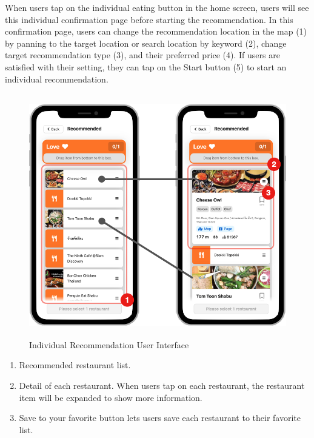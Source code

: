 \documentclass[12pt,oneside,openright,a4paper]{cpe-english-project}
\begin{document}
When users tap on the individual eating button in the home screen, users will see this individual confirmation page before starting the recommendation. In this confirmation page, users can change the recommendation location in the map (1) by panning to the target location or search location by keyword (2), change target recommendation type (3), and their preferred price (4). If users are satisfied with their setting, they can tap on the Start button (5) to start an individual recommendation.
\begin{figure}[H]\centering
\includegraphics[height=300pt]{./images/4ui_IndividualRecommendationUserInterface.png}
\caption{Individual Recommendation User Interface}\label{fig:4ui_IndividualRecommendationUserInterface}
\end{figure}\vspace{-24pt}

\begin{enumerate}
\item Recommended restaurant list.
\item Detail of each restaurant. When users tap on each restaurant, the restaurant item will be expanded to show more information.
\item Save to your favorite button lets users save each restaurant to their favorite list.
\end{enumerate}
\end{document}
